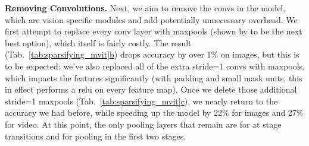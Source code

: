 \documentclass[nohyperref]{article}
\renewcommand{\paragraph}[1]{\vspace{1.25mm}\noindent\textbf{#1}}
\theoremstyle{plain}
\theoremstyle{definition}
\theoremstyle{remark}
\begin{document}
\paragraph{Removing Convolutions.}
Next, we aim to remove the convs in the model, which are vision specific modules and add potentially unnecessary overhead.
We first attempt to replace every conv layer with maxpools (shown by \citet{mvitv1} to be the next best option), which itself is fairly costly.
The result (Tab.~\ref{tab:sparsifying_mvit}\hyperref[tab:sparsifying_mvit]{b}) drops accuracy by over 1\% on images, but this is to be expected: we've also replaced all of the extra {\scriptsize stride=1} convs with maxpools, which impacts the features significantly (with padding and small mask units, this in effect performs a relu on every feature map). Once we delete those additional {\scriptsize stride=1} maxpools (Tab.~\ref{tab:sparsifying_mvit}\hyperref[tab:sparsifying_mvit]{c}), we nearly return to the accuracy we had before, while speeding up the model by 22\% for images and 27\% for video. At this point, the only pooling layers that remain are for  at stage transitions and for  pooling in the first two stages.
\end{document}
